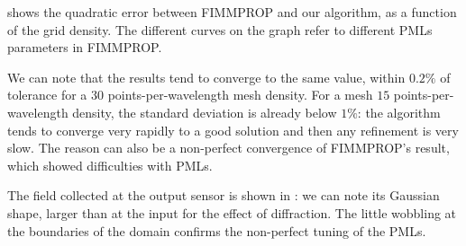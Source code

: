  shows the quadratic error
between FIMMPROP and our algorithm, as a function of the grid
density. The different curves on the graph refer to different PMLs
parameters in FIMMPROP.

We can note that the results tend to converge to the same value,
within $0.2\%$ of tolerance for a $30$ points-per-wavelength mesh
density. For a mesh $15$ points-per-wavelength density, the standard
deviation is already below $1\%$: the algorithm tends to converge very
rapidly to a good solution and then any refinement is very slow. The
reason can also be a non-perfect convergence of FIMMPROP's result,
which showed difficulties with PMLs.

The field collected at the output sensor is shown in
: we can note its Gaussian shape,
larger than at the input for the effect of diffraction. The little
wobbling at the boundaries of the domain confirms the non-perfect
tuning of the PMLs.

